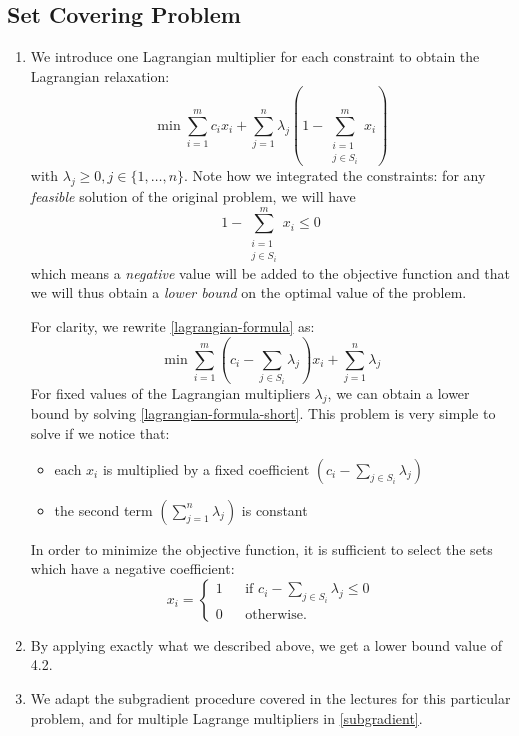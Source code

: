 \subsection{Set Covering Problem}

\begin{enumerate}
    \item We introduce one Lagrangian multiplier for each constraint to obtain the Lagrangian relaxation:
    \begin{equation}
        \label{lagrangian-formula}
        \min \sum_{i=1}^m c_i x_i + \sum_{j=1}^n \lambda_j \left( 1 - \sum_{\substack{i=1\\j \in S_i}}^m x_i \right)
    \end{equation}
    with $\lambda_j \ge 0, j \in \{1,\ldots,n\}$.
    Note how we integrated the constraints: for any \textit{feasible} solution of the original problem, we will have
    \begin{equation}
        1 - \sum_{\substack{i=1\\j \in S_i}}^m x_i \le 0
    \end{equation}
    which means a \textit{negative} value will be added to the objective function and that we will thus obtain a \textit{lower bound} on the optimal value of the problem.
    
    
    For clarity, we rewrite \cref{lagrangian-formula} as:
    \begin{equation}
    \label{lagrangian-formula-short}
        \min \sum_{i=1}^m \left( c_i - \sum_{j \in S_i} \lambda_j \right) x_i + \sum_{j=1}^n \lambda_j
    \end{equation}
    For fixed values of the Lagrangian multipliers $\lambda_j$, we can obtain a lower bound by solving \cref{lagrangian-formula-short}.
    This problem is very simple to solve if we notice that:
    \begin{itemize}
        \item each $x_i$ is multiplied by a fixed coefficient $\left(c_i - \sum_{j \in S_i} \lambda_j\right)$
        \item the second term $\left(\sum_{j=1}^n \lambda_j\right)$ is constant
    \end{itemize}
    In order to minimize the objective function, it is sufficient to select the sets which have a negative coefficient:
    \begin{equation}
        x_i = \left\{ \begin{array}{lcl}
         	1 && \text{if $c_i - \sum_{j \in S_i} \lambda_j \le 0$} \\
        	0 && \text{otherwise.}
         \end{array} \right.
    \end{equation}
    \item By applying exactly what we described above, we get a lower bound value of 4.2.
    \item We adapt the subgradient procedure covered in the lectures for this particular problem, and for multiple Lagrange multipliers in \cref{subgradient}.
    

\end{enumerate}
